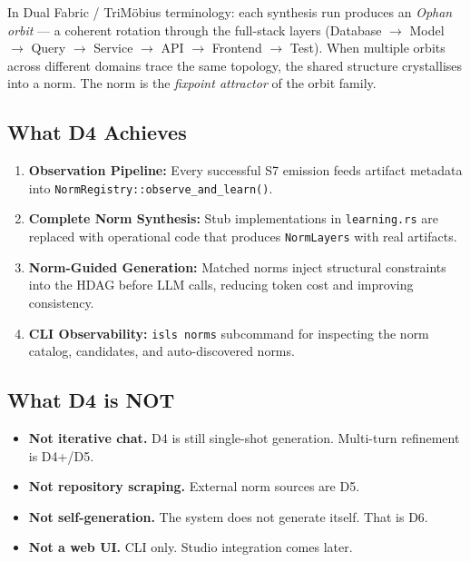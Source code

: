 \documentclass[11pt,a4paper]{article}
\begin{document}
In Dual Fabric / TriM\"obius terminology: each synthesis run produces an 
\emph{Ophan orbit} --- a coherent rotation through the full-stack layers 
(Database $\to$ Model $\to$ Query $\to$ Service $\to$ API $\to$ Frontend 
$\to$ Test). When multiple orbits across different domains trace the same 
topology, the shared structure crystallises into a norm. The norm is the 
\emph{fixpoint attractor} of the orbit family.

\subsection{What D4 Achieves}

\begin{enumerate}[nosep]
\item \textbf{Observation Pipeline:} Every successful S7 emission feeds 
      artifact metadata into \texttt{NormRegistry::observe\_and\_learn()}.
\item \textbf{Complete Norm Synthesis:} Stub implementations in 
      \texttt{learning.rs} are replaced with operational code that produces 
      \texttt{NormLayers} with real artifacts.
\item \textbf{Norm-Guided Generation:} Matched norms inject structural 
      constraints into the HDAG before LLM calls, reducing token cost and 
      improving consistency.
\item \textbf{CLI Observability:} \texttt{isls norms} subcommand for 
      inspecting the norm catalog, candidates, and auto-discovered norms.
\end{enumerate}

\subsection{What D4 is NOT}

\begin{itemize}[nosep]
\item \textbf{Not iterative chat.} D4 is still single-shot generation. 
      Multi-turn refinement is D4+/D5.
\item \textbf{Not repository scraping.} External norm sources are D5.
\item \textbf{Not self-generation.} The system does not generate itself. 
      That is D6.
\item \textbf{Not a web UI.} CLI only. Studio integration comes later.
\end{itemize}


\end{document}

